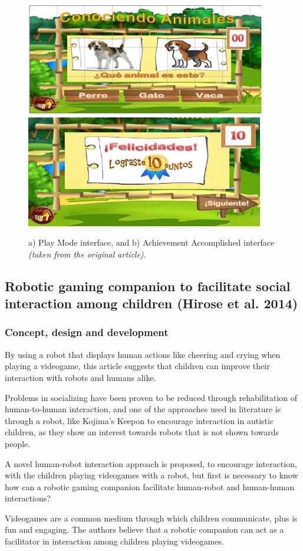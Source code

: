 \documentclass[runningheads]{llncs}
\begin{document}
\begin{figure}
    \centering
    \includegraphics[scale = 0.57]{AnimalArticle1.png}
    \includegraphics[scale = 0.57]{AnimalArticle2.png}
    \caption{a) Play Mode interface, and b) Achievement Accomplished interface \textit{(taken from the original article).}}
    \label{fig:seriousgame}
\end{figure}


\subsection{Robotic gaming companion to facilitate social interaction among children (Hirose et al. 2014)}

\subsubsection{Concept, design and development}
\par By using a robot that displays human actions like cheering and crying when playing a videogame, this article suggests that children can improve their interaction with robots and humans alike.

\par Problems in socializing have been proven to be reduced through rehabilitation of human-to-human interaction, and one of the approaches used in literature is through a robot, like Kojima's Keepon to encourage interaction in autistic children, as they show an interest towards robots that is not shown towards people.
\par A novel human-robot interaction approach is proposed, to encourage interaction, with the children playing videogames with a robot, but first is necessary to know how can a robotic gaming companion facilitate human-robot and human-human interactions?
\par Videogames are a common medium through which children communicate, plus is fun and engaging. The authors believe that a robotic companion can act as a facilitator in interaction among children playing videogames.
\end{document}
